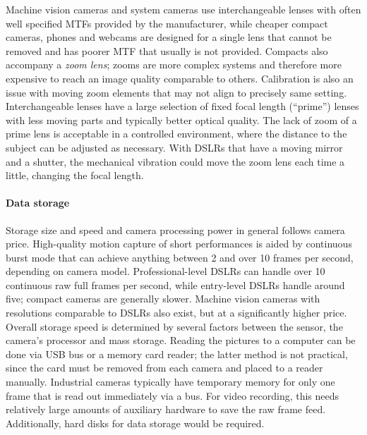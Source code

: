 Machine vision cameras and system cameras use interchangeable lenses with often well specified MTFs provided by the manufacturer, while cheaper compact cameras, phones and webcams are designed for a single lens that cannot be removed and has poorer MTF that usually is not provided. \cite{sick2006machine}
Compacts also accompany a \emph{zoom lens}; zooms are more complex systems and therefore more expensive to reach an image quality comparable to others.
Calibration is also an issue with moving zoom elements that may not align to precisely same setting.
Interchangeable lenses have a large selection of fixed focal length (``prime'') lenses with less moving parts and typically better optical quality.
The lack of zoom of a prime lens is acceptable in a controlled environment, where the distance to the subject can be adjusted as necessary.
With DSLRs that have a moving mirror and a shutter, the mechanical vibration could move the zoom lens each time a little, changing the focal length.


\paragraph{Data storage}
Storage size and speed and camera processing power in general follows camera price.
High-quality motion capture of short performances is aided by continuous burst mode that can achieve anything between 2 and over 10 frames per second, depending on camera model.
Professional-level DSLRs can handle over 10 continuous raw full frames per second, while entry-level DSLRs handle around five;
compact cameras are generally slower.
Machine vision cameras with resolutions comparable to DSLRs also exist, but at a significantly higher price.
Overall storage speed is determined by several factors between the sensor, the camera's processor and mass storage.
Reading the pictures to a computer can be done via USB bus or a memory card reader; the latter method is not practical, since the card must be removed from each camera and placed to a reader manually.
Industrial cameras typically have temporary memory for only one frame that is read out immediately via a bus.
For video recording, this needs relatively large amounts of auxiliary hardware to save the raw frame feed.
Additionally, hard disks for data storage would be required.

